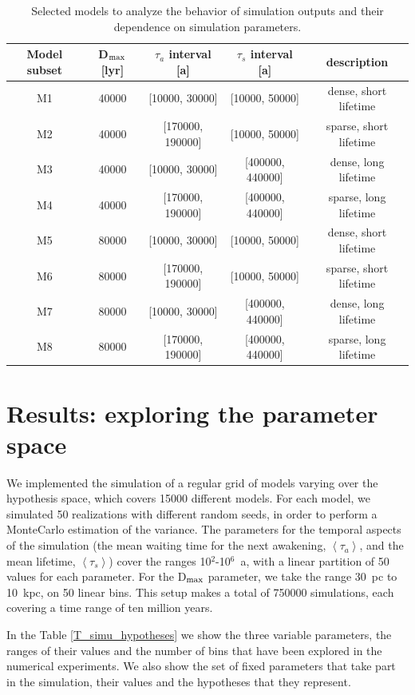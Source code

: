 \documentclass[crop]{CSLB}
\newcommand{\ttn}[1]{}
\begin{document}
\setlength{\tabcolsep}{10pt}
\begin{table}
\centering
\begin{tabular}{ccccc}
\hline
   Model subset & D$_{\rm max}$ [lyr] & $\tau_a$ interval [a] & $\tau_s$ interval 
   [a]& description  \\
\hline
M1 & 40000 & [10000, 30000]   & [10000, 50000]   &dense, short lifetime\\
M2 & 40000 & [170000, 190000] & [10000, 50000]   &sparse, short lifetime\\
M3 & 40000 & [10000, 30000]   & [400000, 440000] &dense, long lifetime \\
M4 & 40000 & [170000, 190000] & [400000, 440000] &sparse, long lifetime\\
%
M5 & 80000 & [10000, 30000]   & [10000, 50000]   &dense, short lifetime\\
M6 & 80000 & [170000, 190000] & [10000, 50000]   &sparse, short lifetime\\
M7 & 80000 & [10000, 30000]   & [400000, 440000] &dense, long lifetime \\
M8 & 80000 & [170000, 190000] & [400000, 440000] &sparse, long lifetime\\
%
\hline
\end{tabular}
\caption{Selected models to analyze the behavior of simulation outputs
   and their dependence on simulation parameters.}
\label{T_selected_models}
\end{table}

 


\section{Results: exploring the parameter space}\label{S_results}

We implemented the simulation of a regular grid of models varying over
the hypothesis space, which covers 15000 different models.
%
For each model, we simulated 50 realizations with different random
seeds, in order to perform a MonteCarlo estimation of the variance.
%
The parameters for the temporal aspects of the simulation (the mean
waiting time for the next awakening, $\left<\tau_a\right>$, and the
mean lifetime, $\left<\tau_s\right>$) cover the ranges 10$^2$-10$^6$~a, with a linear partition of 50 values for each parameter.
%
For the D$_{\rm max}$ parameter, we take the range 30~pc to 10~kpc, on
50 linear bins.
%
This setup makes a total of 750000 simulations, each covering a time
range of ten million years.
%
\ttn{1}
%
In the Table \ref{T_simu_hypotheses} we show the three variable
parameters, the ranges of their values and the number of bins that
have been explored in the numerical experiments.
%
We also show the set of fixed parameters that take part in the simulation,
their values and the hypotheses that they represent.
\end{document}
